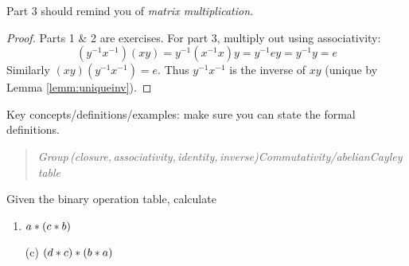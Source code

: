 Part 3 should remind you of \emph{matrix multiplication.}

\begin{proof}
	Parts 1 \& 2 are exercises. For part 3, multiply out using associativity:
	\[
		(y^{-1}x^{-1})(xy)=y^{-1}(x^{-1}x)y=y^{-1}ey=y^{-1}y=e
	\]
	Similarly $(xy)(y^{-1}x^{-1})=e$. Thus $y^{-1}x^{-1}$ is the inverse of $xy$ (unique by Lemma \ref{lemm:uniqueinv}).
\end{proof}


\begin{exercises}
	Key concepts/definitions/examples: make sure you can state the formal definitions.
	\begin{quote}
		\emph{Group\,(closure,\,associativity,\,identity,\,inverse)\qquad Commutativity/abelian\qquad Cayley table}
	\end{quote}

	\begin{enumerate}
	  \begin{minipage}[t]{0.72\linewidth}\vspace{-5pt}
			\item Given the binary operation table, calculate
			\begin{enumerate}\itemsep0pt
				\item {} $a\mathbin{\ast} (c\mathbin{\ast} b)$
				\item[(c)]  $(d\mathbin{\ast} c)\mathbin{\ast} (b\mathbin{\ast} a)$
			\end{enumerate}
		\end{minipage}
		\hfill
		\begin{minipage}[t]{0.2\linewidth}\vspace{-5pt}
			\flushright {}
		\end{minipage}
		\smallbreak
	

\end{enumerate}
\end{exercises}
